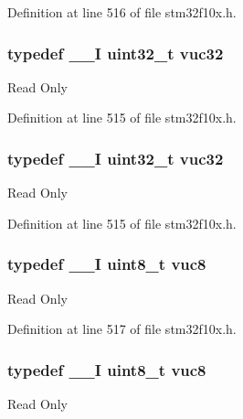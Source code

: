 Definition at line 516 of file stm32f10x.\+h.

\subsubsection[{\texorpdfstring{vuc32}{vuc32}}]{\setlength{\rightskip}{0pt plus 5cm}typedef {\bf \+\_\+\+\_\+I} {\bf uint32\+\_\+t} {\bf vuc32}}\hypertarget{group___exported__types_ga2e08e321a35a55e72c5b3a507e76371f}{}\label{group___exported__types_ga2e08e321a35a55e72c5b3a507e76371f}
Read Only 

Definition at line 515 of file stm32f10x.\+h.

\subsubsection[{\texorpdfstring{vuc32}{vuc32}}]{\setlength{\rightskip}{0pt plus 5cm}typedef {\bf \+\_\+\+\_\+I} {\bf uint32\+\_\+t} {\bf vuc32}}\hypertarget{group___exported__types_ga2e08e321a35a55e72c5b3a507e76371f}{}\label{group___exported__types_ga2e08e321a35a55e72c5b3a507e76371f}
Read Only 

Definition at line 515 of file stm32f10x.\+h.

\subsubsection[{\texorpdfstring{vuc8}{vuc8}}]{\setlength{\rightskip}{0pt plus 5cm}typedef {\bf \+\_\+\+\_\+I} {\bf uint8\+\_\+t} {\bf vuc8}}\hypertarget{group___exported__types_gab0ec90ac9b2c5864755998c8d37c264a}{}\label{group___exported__types_gab0ec90ac9b2c5864755998c8d37c264a}
Read Only 

Definition at line 517 of file stm32f10x.\+h.

\subsubsection[{\texorpdfstring{vuc8}{vuc8}}]{\setlength{\rightskip}{0pt plus 5cm}typedef {\bf \+\_\+\+\_\+I} {\bf uint8\+\_\+t} {\bf vuc8}}\hypertarget{group___exported__types_gab0ec90ac9b2c5864755998c8d37c264a}{}\label{group___exported__types_gab0ec90ac9b2c5864755998c8d37c264a}
Read Only 

